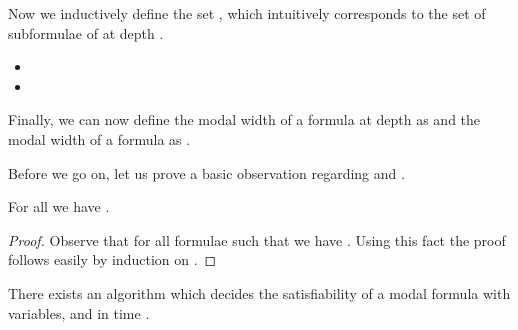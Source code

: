 \documentclass{llncs}
\begin{document}
Now we inductively define the set , which intuitively corresponds to
the set of subformulae of  at depth .

\begin{itemize}

\item 

\item 

\end{itemize}

Finally, we can now define the modal width of a formula  at depth  as
 and the modal width of a formula as
.

Before we go on, let us prove a basic observation regarding  and
.

\begin{lemma} 
For all  we have .
\end{lemma}

\begin{proof}

Observe that for all formulae  such that  we have
. Using this fact the proof
follows easily by induction on .

\end{proof}



\begin{theorem}

There exists an algorithm which decides the satisfiability of a
modal formula  with  variables,  and
 in time .

\end{theorem}
\end{document}
